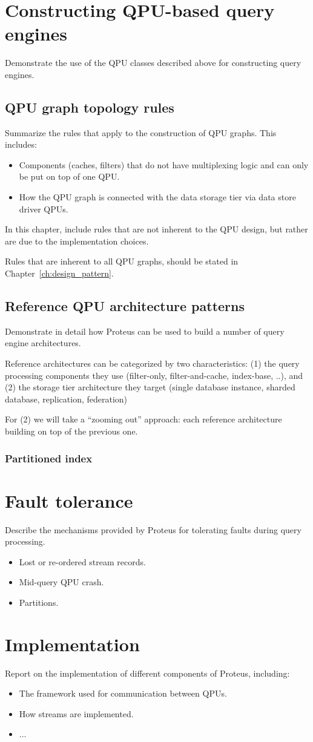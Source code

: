 \section{Constructing QPU-based query engines}
Demonstrate the use of the QPU classes described above for constructing query
engines.

\subsection{QPU graph topology rules}
Summarize the rules that apply to the construction of QPU graphs.
This includes:
\begin{itemize}
  \item Components (caches, filters) that do not have multiplexing logic and can
  only be put on top of one QPU.
  \item How the QPU graph is connected with the data storage tier via data store
  driver QPUs.
\end{itemize}

In this chapter, include rules that are not inherent to the QPU design, but
rather are due to the implementation choices.

Rules that are inherent to all QPU graphs, should be stated in
Chapter~\ref{ch:design_pattern}.


\subsection{Reference QPU architecture patterns}
Demonstrate in detail how Proteus can be used to build a number of query engine
architectures.

Reference architectures can be categorized by two characteristics: (1) the query
processing components they use (filter-only, filter-and-cache, index-base, ..),
and (2) the storage tier architecture they target (single database instance,
sharded database, replication, federation)

For (2) we will take a ``zooming out'' approach: each reference architecture
building on top of the previous one.

\subsubsection{Partitioned index}

\section{Fault tolerance}
Describe the mechanisms provided by Proteus for tolerating faults during query
processing.
\begin{itemize}
  \item Lost or re-ordered stream records.
  \item Mid-query QPU crash.
  \item Partitions.
\end{itemize}

\section{Implementation}
Report on the implementation of different components of Proteus, including:
\begin{itemize}
  \item The framework used for communication between QPUs.
  \item How streams are implemented.
  \item ...
\end{itemize}
